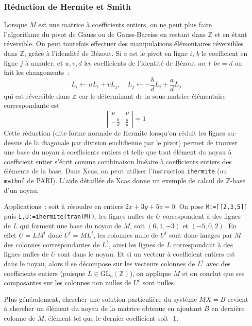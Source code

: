 \documentclass[a4paper,11pt]{article}
\newcommand{\Z}{{\mathbb{Z}}}
\begin{document}
\subsubsection{R\'eduction de Hermite et Smith} 
Lorsque $M$ est une matrice \`a coefficients entiers, 
on ne peut plus faire l'algorithme du pivot de Gauss ou de
Gauss-Bareiss en restant dans $\Z$ et en \'etant r\'eversible.
On peut toutefois effectuer des manipulations \'el\'ementaires
r\'eversibles dans $\Z$, gr\^ace \`a l'idendit\'e de B\'ezout. Si $a$
est le pivot en ligne $i$, $b$ le coefficient en ligne $j$ \`a
annuler, et $u, v, d$ les coefficients de l'identit\'e de B\'ezout
$a u + b v =d$ on fait les changements~:
\[ L_i \leftarrow uL_i +v L_j, \quad 
L_j \leftarrow -\frac{b}{d} L_i + \frac{a}{d} L_j \]
qui est r\'eversible dans $\Z$
car le d\'eterminant de la sous-matrice \'el\'ementaire
correspondante est
\[ \left| \begin{array}{cc}
u & v \\
-\frac{b}{d} & \frac{a}{d}
\end{array} \right| = 1
\]
Cette r\'eduction (dite forme normale de Hermite 
lorsqu'on r\'eduit les lignes
au-dessus de la diagonale par division euclidienne par
le pivot) permet de trouver une base du noyau
\`a coefficients entiers et telle que tout \'el\'ement du noyau \`a 
coefficient entier s'\'ecrit comme combinaison lin\'eaire \`a coefficients
entiers des \'el\'ements de la base.
Dans Xcas, on peut utiliser l'instruction \verb|ihermite| (ou
\verb|mathnf| de PARI). L'aide
d\'etaill\'ee de Xcas donne un exemple de calcul de $\Z$-base
d'un noyau. 

Applications~: soit \`a r\'esoudre en entiers $2x+3y+5z=0$.
On pose \verb|M:=[[2,3,5]]| puis 
\verb|L,U:=ihermite(tran(M))|, les lignes nulles de $U$ correspondent
\`a des lignes de $L$ qui forment une base du noyau de $M$, soit
$(6,1,-3)$ et $(-5,0,2)$.
En effet $U=L M^t$ donc $U^t=M L^t$, les colonnes nulle 
de $U^t$ sont donc images par $M$ des colonnes
correspondantes de $L^t$, ainsi les lignes de $L$ correspondant
\`a des lignes nulles de $U$ sont dans le noyau. Et si un vecteur
\`a coefficient entiers est dans le noyau, alors il se d\'ecompose
sur les vecteurs colonnes de $L^t$ avec des coefficients entiers
(puisque $L\in$GL$_n(\Z)$), on applique $M$ et on conclut
que ses composantes sur les colonnes non nulles de $U^t$ sont nulles.

Plus g\'en\'eralement, chercher une solution particuli\`ere
du syst\`eme $MX=B$ revient
\`a chercher un \'el\'ement du noyau de la matrice obtenue en
ajoutant $B$ en derni\`ere colonne de $M$,
\'el\'ement tel que le dernier coefficient
soit -1.
\end{document}
